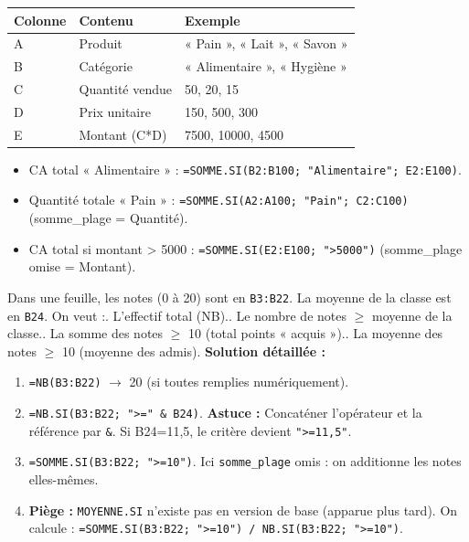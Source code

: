 \documentclass[11pt]{article}
\begin{document}
\begin{exemplebox}
\begin{center}
\begin{tabularx}{\linewidth}{|l|X|X|}\hline
\textbf{Colonne} & \textbf{Contenu} & \textbf{Exemple} \\\hline
A & Produit & « Pain », « Lait », « Savon » \\\hline
B & Catégorie & « Alimentaire », « Hygiène » \\\hline
C & Quantité vendue & 50, 20, 15 \\\hline
D & Prix unitaire & 150, 500, 300 \\\hline
E & Montant (C*D) & 7500, 10000, 4500 \\\hline
\end{tabularx}
\end{center}
\begin{itemize}
    \item CA total « Alimentaire » : \texttt{=SOMME.SI(B2:B100; "Alimentaire"; E2:E100)}.
    \item Quantité totale « Pain » : \texttt{=SOMME.SI(A2:A100; "Pain"; C2:C100)} (somme\_plage = Quantité).
    \item CA total si montant > 5000 : \texttt{=SOMME.SI(E2:E100; ">5000")} (somme\_plage omise = Montant).
\end{itemize}
\end{exemplebox}

\begin{exoresolu}
{Dans une feuille, les notes (0 à 20) sont en \texttt{B3:B22}. La moyenne de la classe est en \texttt{B24}. On veut :. L'effectif total (NB).. Le nombre de notes $\ge$ moyenne de la classe.. La somme des notes $\ge$ 10 (total points « acquis »).. La moyenne des notes $\ge$ 10 (moyenne des admis).}
\tcblower
\textbf{Solution détaillée :}
\begin{enumerate}
    \item \texttt{=NB(B3:B22)} $\rightarrow$ 20 (si toutes remplies numériquement).
    \item \texttt{=NB.SI(B3:B22; ">=" \& B24)}. \textbf{Astuce :} Concaténer l'opérateur et la référence par \texttt{\&}. Si B24=11,5, le critère devient \texttt{">=11,5"}.
    \item \texttt{=SOMME.SI(B3:B22; ">=10")}. Ici \texttt{somme\_plage} omis : on additionne les notes elles-mêmes.
    \item \textbf{Piège :} \texttt{MOYENNE.SI} n'existe pas en version de base (apparue plus tard). On calcule : \texttt{=SOMME.SI(B3:B22; ">=10") / NB.SI(B3:B22; ">=10")}.
\end{enumerate}

\end{exoresolu}
\end{document}
